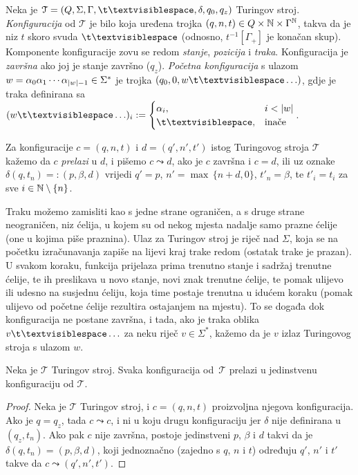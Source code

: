 \begin{definicija}[{name=[Turing-konfiguracije i prijelazi među njima]}]
Neka je $\mathcal T=(Q,\Sigma,\Gamma,\bl,\delta,q_0,q_z)$ Turingov stroj. \emph{Konfiguracija} od $\mathcal T$ je bilo koja uređena trojka $(q,n,t)\in Q\times{\mathbb N}\times\Gamma^{\mathbb N}$, takva da je niz $t$ skoro svuda $\bl$ (odnosno, $t^{-1}[\Gamma_+]$ je konačan skup). Komponente konfiguracije zovu se redom \emph{stanje}, \emph{pozicija} i \emph{traka}. Konfiguracija je \emph{završna} ako joj je stanje završno ($q_z$). \emph{Početna konfiguracija} s ulazom $w=\alpha_0\alpha_1\dotsm\alpha_{\lvert w\rvert-1}\in\Sigma^*$ je trojka $(q_0,0,w\bl\ldots)$, gdje je traka definirana sa $(w\bl\ldots)_i:=\begin{cases}
\alpha_i,&i<\dulj{w}\\
\bl,&\text{inače}
\end{cases}$.

Za konfiguracije $c=(q,n,t)$ i $d=(q',n',t')$ istog Turingovog stroja $\mathcal T$ kažemo da $c$ \emph{prelazi} u $d$, i pišemo $c\leadsto d$, ako je $c$ završna i $c=d$, ili uz oznake $\delta(q,t_n)=:(p,\beta,d)$ vrijedi $q'=p$, $n'=\max\,\{n+d,0\}$, $t'_n=\beta$, te $t'_i=t_i$ za sve $i\in{\mathbb N}\setminus\{n\}$.
\end{definicija}

Traku možemo zamisliti kao s jedne strane ograničen, a s druge strane neograničen, niz ćelija, u kojem su od nekog mjesta nadalje samo prazne ćelije (one u kojima piše praznina). Ulaz za Turingov stroj je riječ nad $\Sigma$, koja se na početku izračunavanja zapiše na lijevi kraj trake redom (ostatak trake je prazan). U svakom koraku, funkcija prijelaza prima trenutno stanje i sadržaj trenutne ćelije, te ih preslikava u novo stanje, novi znak trenutne ćelije, te pomak ulijevo ili udesno na susjednu ćeliju, koja time postaje trenutna u idućem koraku (pomak ulijevo od početne ćelije rezultira ostajanjem na mjestu). To se događa dok konfiguracija ne postane završna, i tada, ako je traka oblika $v\bl\ldots$ za neku riječ $v\in\Sigma^*$, kažemo da je $v$ izlaz Turingovog stroja s ulazom $w$.

\begin{lema}[{name=[determinističnost Turingovih strojeva]}]\label{lm:Turingdet}
Neka je $\mathcal T$ Turingov stroj. Svaka konfiguracija od \,$\mathcal T$ prelazi u jedinstvenu konfiguraciju od $\mathcal T$.
\end{lema}
\begin{proof}
Neka je $\mathcal T$ Turingov stroj, i $c=(q,n,t)$ proizvoljna njegova konfiguracija. Ako je $q=q_z$, tada $c\leadsto c$, i ni u koju drugu konfiguraciju jer $\delta$ nije definirana u $(q_z,t_n)$. Ako pak $c$ nije završna, postoje jedinstveni $p$, $\beta$ i $d$ takvi da je $\delta(q,t_n)=(p,\beta,d)$, koji jednoznačno (zajedno s $q$, $n$ i $t$) određuju $q'$, $n'$ i $t'$ takve da $c\leadsto(q',n',t')$.
\end{proof}


